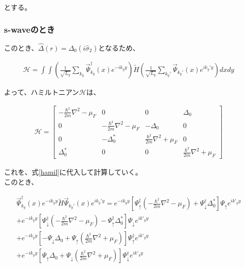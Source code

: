 \documentclass{jsarticle}
\begin{document}
            とする。
            
        \subsubsection{s-waveのとき}
    	このとき、$\hat{\Delta}(r)=\Delta_0 \left( i \hat{\sigma}_2 \right)$となるため、
    	
    		
            \begin{align}
                \mathcal{H}=\int \int \left( \frac{1}{\sqrt{L_y}}\sum_{k_y} \vec{\Psi}^\dagger _{k_y}(x) e^{-ik_yy} \right) \tilde{H} \left( \frac{1}{\sqrt{L_y}}\sum_{k_y'} \vec{\Psi}_{k_y'}(x) e^{ik_y'y} \right) dxdy
                \label{hamil}
            \end{align}
    
            よって、ハミルトニアン$\mathcal{H}$は、
    
            \begin{align}
                \mathcal{H}=
                \begin{bmatrix}
                    -\frac{\hbar^2}{2m}\nabla^2-\mu_F & 0 & 0 & \Delta_0 \\
                    0 & -\frac{\hbar^2}{2m}\nabla^2-\mu_F & -\Delta_0 & 0 \\
                    0 & -\Delta_0^\ast & \frac{\hbar^2}{2m}\nabla^2+\mu_F & 0 \\
                    \Delta_0^\ast & 0 & 0 & \frac{\hbar^2}{2m}\nabla^2+\mu_F
                \end{bmatrix}
            \end{align}
    
            これを、式\eqref{hamil}に代入して計算していく。　\\
            このとき、
    
            \begin{align}
                \vec{\Psi}_{k_y}^\dagger(x) e^{-ik_yy} \tilde{H}  \vec{\Psi}_{k_y'}(x) e^{ik_y'y} =
                e^{-ik_yy} \left[ \Psi_\uparrow^\dagger \left( -\frac{\hbar^2}{2m}\nabla^2-\mu_F \right) +\Psi_\downarrow^\dagger \Delta_0^\ast \right] \Psi_\uparrow e^{ik'_yy} \nonumber\\
                +e^{-ik_yy} \left[ \Psi_\downarrow^\dagger \left( -\frac{\hbar^2}{2m}\nabla^2-\mu_F \right) -\Psi_\uparrow^\dagger \Delta_0^\ast \right] \Psi_\downarrow e^{ik'_yy} \nonumber\\
                + e^{-ik_yy} \left[ -\Psi_\downarrow\Delta_0 +\Psi_\uparrow \left( \frac{\hbar^2}{2m}\nabla^2+\mu_F \right) \right] \Psi_\uparrow^\dagger e^{ik'_yy} \nonumber\\
                +e^{-ik_yy} \left[ \Psi_\uparrow\Delta_0 +\Psi_\downarrow \left( \frac{\hbar^2}{2m}\nabla^2+\mu_F \right) \right] \Psi_\downarrow^\dagger e^{ik'_yy}
            \end{align}
    
\end{document}

